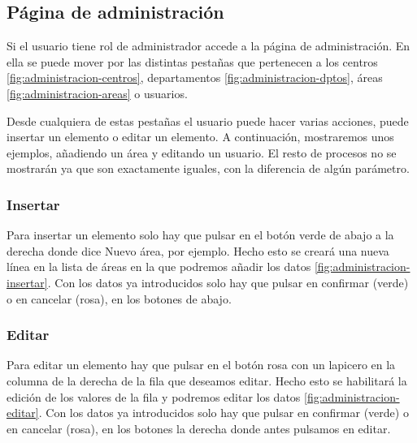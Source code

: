 
\subsection{Página de administración}

Si el usuario tiene rol de administrador accede a la página de administración. En ella se puede mover por las distintas pestañas que pertenecen a los centros \ref{fig:administracion-centros}, departamentos \ref{fig:administracion-dptos}, áreas \ref{fig:administracion-areas} o usuarios.


Desde cualquiera de estas pestañas el usuario puede hacer varias acciones, puede insertar un elemento o editar un elemento. A continuación, mostraremos unos ejemplos, añadiendo un área y editando un usuario. El resto de procesos no se mostrarán ya que son exactamente iguales, con la diferencia de algún parámetro.

\subsubsection{Insertar}

Para insertar un elemento solo hay que pulsar en el botón verde de abajo a la derecha donde dice Nuevo área, por ejemplo. Hecho esto se creará una nueva línea en la lista de áreas en la que podremos añadir los datos \ref{fig:administracion-insertar}. Con los datos ya introducidos solo hay que pulsar en confirmar (verde) o en cancelar (rosa), en los botones de abajo.


\subsubsection{Editar}

Para editar un elemento hay que pulsar en el botón rosa con un lapicero en la columna de la derecha de la fila que deseamos editar. Hecho esto se habilitará la edición de los valores de la fila y podremos editar los datos \ref{fig:administracion-editar}. Con los datos ya introducidos solo hay que pulsar en confirmar (verde) o en cancelar (rosa), en los botones la derecha donde antes pulsamos en editar.

